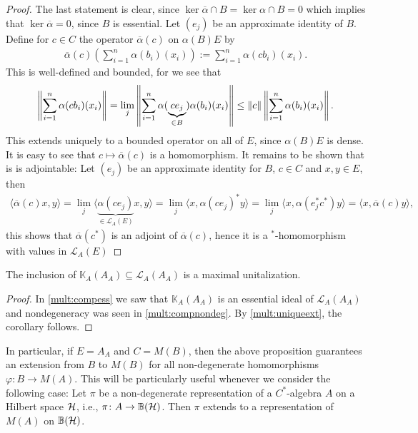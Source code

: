 \begin{proof}
	The last statement is clear, since $\ker \overline \alpha \cap B = \ker \alpha \cap B = 0$ which implies that $\ker \overline \alpha = 0$, since $B$ is essential. Let $(e_j)$ be an approximate identity of $B$. Define for $c \in C$ the operator $\overline \alpha(c)$ on $\alpha(B)E$ by
	\begin{align*}
		\overline \alpha(c) \left( \sum_{i=1}^n \alpha(b_i)(x_i) \right):= \sum_{i=1}^n \alpha(c b_i) (x_i).
	\end{align*}
	This is well-defined and bounded, for we see that
	\begin{align*}
		\left\lVert \sum_{i=1}^n \alpha(c b_i) (x_i) \right\rVert = \lim_{j} \left\lVert \sum_{i=1}^n \alpha(\underbrace{c e_j}_{\in B})\alpha(b_i) (x_i) \right\rVert \leq \left\lVert c \right\rVert \left\lVert \sum_{i=1}^n \alpha(b_i) (x_i)\right\rVert.
	\end{align*}
	This extends uniquely to a bounded operator on all of $E$, since $\alpha(B)E$ is dense. It is easy to see that $c \mapsto \overline \alpha(c)$ is a homomorphism. It remains to be shown that is is adjointable: Let $(e_j)$ be an approximate identity for $B$, $c \in C$ and $x,y \in E$, then
	\begin{align*}
		\langle \overline \alpha(c) x,y \rangle = \lim_{j} \langle \underbrace{\alpha(ce_j)}_{\in \mathcal{L}_A(E)} x, y \rangle = \lim_j \langle x , \alpha(ce_j)^* y\rangle = \lim_j  \langle x , \alpha(e_j^*c^*) y\rangle =  \langle  x, \overline \alpha(c) y\rangle,
	\end{align*}
	this shows that $\overline \alpha(c^*)$ is an adjoint of $\overline \alpha (c)$, hence it is a $^*$-homomorphism with values in $\mathcal{L}_A(E)$
\end{proof}
\begin{corollary}
	The inclusion of $\mathbb{K}_A(A_A) \subseteq \mathcal{L}_A(A_A)$ is a maximal unitalization.	
\end{corollary}
\begin{proof}
	In \ref{mult:compess} we saw that $\mathbb{K}_A(A_A)$ is an essential ideal of $\mathcal{L}_A(A_A)$ and nondegeneracy was seen in \ref{mult:compnondeg}. By \ref{mult:uniqueext}, the corollary follows.
\end{proof}
In particular, if $E=A_A$ and $C = M(B)$, then the above proposition guarantees an extension from $B$ to $M(B)$ for all non-degenerate homomorphisms $\varphi \colon B \to M(A)$. This will be particularly useful whenever we consider the following case: Let $\pi$ be a non-degenerate representation of a $C^*$-algebra $A$ on a Hilbert space $\mathcal{H}$, i.e., $\pi \colon A \to \mathbb{B}(\mathcal{H})$. Then $\pi$ extends to a representation of $M(A)$ on $\mathbb{B}(\mathcal{H})$. 

